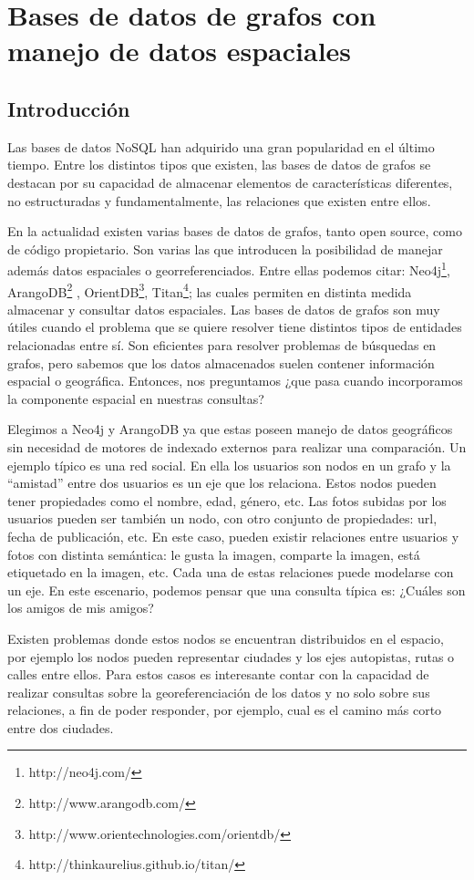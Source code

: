 \documentclass{llncs}
\begin{document}
\section{Bases de datos de grafos con manejo de datos espaciales}
\subsection{Introducción} %
Las bases de datos NoSQL han
adquirido una gran popularidad en el último tiempo. Entre los
distintos tipos que existen, las bases de datos de grafos se destacan
por su capacidad de almacenar elementos de características diferentes,
no estructuradas y fundamentalmente, las relaciones que existen entre
ellos.

En la actualidad existen varias bases de datos de grafos, tanto open
source, como de código propietario. Son varias las que introducen la
posibilidad de manejar además datos espaciales o georreferenciados.
Entre ellas podemos citar: Neo4j\footnote{http://neo4j.com/}, ArangoDB\footnote{http://www.arangodb.com/}
, OrientDB\footnote{http://www.orientechnologies.com/orientdb/}, Titan\footnote{http://thinkaurelius.github.io/titan/}; las
cuales permiten en distinta medida almacenar y consultar datos
espaciales. Las bases de datos de grafos son muy útiles cuando el
problema que se quiere resolver tiene distintos tipos de entidades
relacionadas entre sí.  Son eficientes para resolver problemas de
búsquedas en grafos, pero sabemos que los datos almacenados suelen
contener información espacial o geográfica. Entonces, nos preguntamos
¿que pasa cuando incorporamos la componente espacial en nuestras
consultas?

Elegimos a Neo4j y ArangoDB ya que estas poseen manejo de datos
geográficos sin necesidad de motores de indexado externos para
realizar una comparación. Un ejemplo típico es una red social. En ella
los usuarios son nodos en un grafo y la “amistad” entre dos usuarios
es un eje que los relaciona. Estos nodos pueden tener propiedades como
el nombre, edad, género, etc. Las fotos subidas por los usuarios
pueden ser también un nodo, con otro conjunto de propiedades: url,
fecha de publicación, etc. En este caso, pueden existir relaciones
entre usuarios y fotos con distinta semántica: le gusta la imagen,
comparte la imagen, está etiquetado en la imagen, etc. Cada una de
estas relaciones puede modelarse con un eje. En este escenario,
podemos pensar que una consulta típica es: ¿Cuáles son los amigos de
mis amigos?

Existen problemas donde estos nodos se encuentran distribuidos en el
espacio, por ejemplo los nodos pueden representar ciudades y los ejes
autopistas, rutas o calles entre ellos. Para estos casos es
interesante contar con la capacidad de realizar consultas sobre la
georeferenciación de los datos y no solo sobre sus relaciones, a fin
de poder responder, por ejemplo, cual es el camino más corto entre dos
ciudades.
\end{document}
